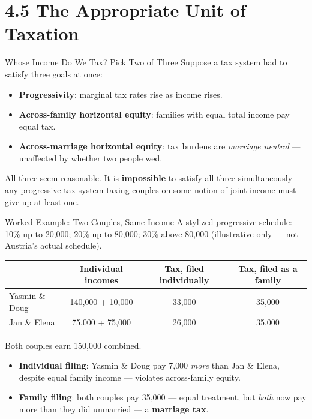 \documentclass[11pt,aspectratio=169]{beamer}
\begin{document}
\section{4.5 The Appropriate Unit of Taxation}

\begin{frame}{Whose Income Do We Tax? Pick Two of Three}
	\small
	Suppose a tax system had to satisfy three goals at once:
	\begin{itemize}
		\item \textbf{Progressivity}: marginal tax rates rise as income rises.
		\item \textbf{Across-family horizontal equity}: families with equal total income pay equal tax.
		\item \textbf{Across-marriage horizontal equity}: tax burdens are \emph{marriage neutral} --- unaffected by whether two people wed.
	\end{itemize}
	\vspace{0.3em}

		All three seem reasonable. It is \textbf{impossible} to satisfy all three simultaneously --- any progressive tax system taxing couples on some notion of joint income must give up at least one.


\end{frame}

\begin{frame}{Worked Example: Two Couples, Same Income}
	\footnotesize
	A stylized progressive schedule: 10\% up to \texteuro{}20{,}000; 20\% up to \texteuro{}80{,}000; 30\% above \texteuro{}80{,}000 (illustrative only --- not Austria's actual schedule).
	\vspace{0.3em}
	\begin{center}
		\begin{tabular}{@{}lccc@{}}
			\toprule
			& \textbf{Individual incomes} & \textbf{Tax, filed individually} & \textbf{Tax, filed as a family} \\
			\midrule
			Yasmin \& Doug & \texteuro{}140{,}000 + \texteuro{}10{,}000 & \texteuro{}33{,}000 & \texteuro{}35{,}000 \\
			Jan \& Elena & \texteuro{}75{,}000 + \texteuro{}75{,}000 & \texteuro{}26{,}000 & \texteuro{}35{,}000 \\
			\bottomrule
		\end{tabular}
	\end{center}
	\vspace{0.3em}
	Both couples earn \texteuro{}150{,}000 combined.
	\begin{itemize}
		\item \textbf{Individual filing}: Yasmin \& Doug pay \texteuro{}7{,}000 \emph{more} than Jan \& Elena, despite equal family income --- violates across-family equity.
		\item \textbf{Family filing}: both couples pay \texteuro{}35{,}000 --- equal treatment, but \emph{both} now pay more than they did unmarried --- a \textbf{marriage tax}.
	\end{itemize}

\end{frame}
\end{document}
